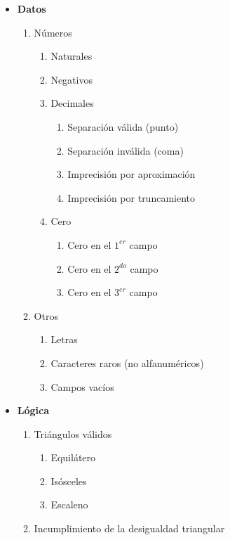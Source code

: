 \begin{itemize}
	\item \textbf{Datos}
		\begin{enumerate}[label=D\arabic*.]
			\item Números
				\begin{enumerate}[label=D1.\arabic*.]
					\item Naturales
					\item Negativos
					\item Decimales
						\begin{enumerate}[label=D1.3.\arabic*.]
							\item Separación válida (punto)
							\item Separación inválida (coma)
							\item Imprecisión por aproximación
							\item Imprecisión por truncamiento
						\end{enumerate}
					\item Cero
						\begin{enumerate}[label=D2.3.\arabic*.]
							\item Cero en el $1^{er}$ campo
							\item Cero en el $2^{do}$ campo
							\item Cero en el $3^{er}$ campo
						\end{enumerate}
				\end{enumerate}
			\item Otros
				\begin{enumerate}[label=D2.\arabic*.]
					\item Letras
					\item Caracteres raros (no alfanuméricos)
					\item Campos vacíos
				\end{enumerate}
		\end{enumerate}
	\item \textbf{Lógica}
		\begin{enumerate}[label=L\arabic*.]
			\item Triángulos válidos
				\begin{enumerate}[label=L1.\arabic*.]
					\item Equilátero
					\item Isósceles
					\item Escaleno
				\end{enumerate}
			\item Incumplimiento de la desigualdad triangular
				\begin{enumerate}[label=L2.\arabic*.]

\end{enumerate}
\end{enumerate}
\end{itemize}
